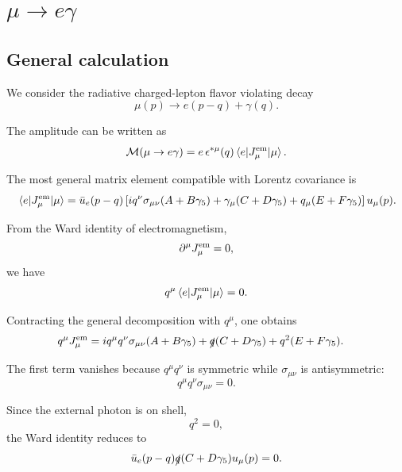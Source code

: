 \documentclass[11pt]{article}
\begin{document}
\section*{$\mu \to e \gamma$}

\subsection*{General calculation}

We consider the radiative charged-lepton flavor violating decay
\begin{equation}
    \mu(p) \to e(p-q) + \gamma(q).
\end{equation}

The amplitude can be written as
\begin{equation}
    \mathcal{M}(\mu \to e\gamma)
    =
    e\, \epsilon^{*\mu}(q)
    \mel{e}{J_\mu^{\rm em}}{\mu}.
\end{equation}

The most general matrix element compatible with Lorentz covariance is
\begin{equation}
    \mel{e}{J_\mu^{\rm em}}{\mu}
    =
    \bar{u}_e(p-q)
    \left[
        i q^\nu \sigma_{\mu\nu} (A + B\gamma_5)
        + \gamma_\mu (C + D\gamma_5)
        + q_\mu (E + F\gamma_5)
    \right]
    u_\mu(p).
\end{equation}

From the Ward identity of electromagnetism,
\begin{equation}
    \partial^\mu J_\mu^{\rm em}=0,
\end{equation}
we have
\begin{equation}
    q^\mu \mel{e}{J_\mu^{\rm em}}{\mu}=0.
\end{equation}

Contracting the general decomposition with $q^\mu$, one obtains
\begin{align}
    q^\mu J_\mu^{\rm em}
    &=
    i q^\mu q^\nu \sigma_{\mu\nu}(A+B\gamma_5)
    + \slashed{q}(C+D\gamma_5)
    + q^2(E+F\gamma_5).
\end{align}

The first term vanishes because $q^\mu q^\nu$ is symmetric while
$\sigma_{\mu\nu}$ is antisymmetric:
\begin{equation}
    q^\mu q^\nu \sigma_{\mu\nu}=0.
\end{equation}

Since the external photon is on shell,
\begin{equation}
    q^2=0,
\end{equation}
the Ward identity reduces to
\begin{equation}
    \bar{u}_e(p-q)\slashed{q}(C+D\gamma_5)u_\mu(p)=0.
\end{equation}
\end{document}
